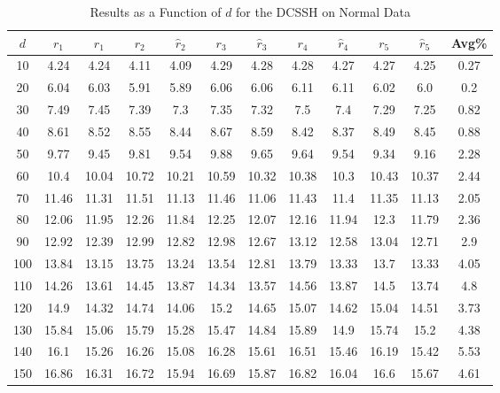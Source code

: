 \documentclass[11pt,twoside]{report}
\theoremstyle{definition}
\numberwithin{theorem}{section}
\numberwithin{definition}{section}
\numberwithin{lemma}{section}
\numberwithin{proposition}{section}
\numberwithin{equation}{section}
\numberwithin{figure}{section}
\begin{document}
\begin{appendices}
    \begin{table}[ht]
        \centering
        \begin{tabular}{|c||cc||cc||cc||cc||cc||c|} \hline
            $d$&$r_1$&$\hat{r}_1$&$r_2$&$\hat{r}_2$&$r_3$&$\hat{r}_3$&$r_4$&$\hat{r}_4$&$r_5$&$\hat{r}_5$&Avg\% \\ \hline
            10&4.24&4.24&4.11&4.09&4.29&4.28&4.28&4.27&4.27&4.25&0.27 \\
            20&6.04&6.03&5.91&5.89&6.06&6.06&6.11&6.11&6.02&6.0&0.2 \\
            30&7.49&7.45&7.39&7.3&7.35&7.32&7.5&7.4&7.29&7.25&0.82 \\
            40&8.61&8.52&8.55&8.44&8.67&8.59&8.42&8.37&8.49&8.45&0.88 \\
            50&9.77&9.45&9.81&9.54&9.88&9.65&9.64&9.54&9.34&9.16&2.28 \\
            60&10.4&10.04&10.72&10.21&10.59&10.32&10.38&10.3&10.43&10.37&2.44 \\
            70&11.46&11.31&11.51&11.13&11.46&11.06&11.43&11.4&11.35&11.13&2.05 \\
            80&12.06&11.95&12.26&11.84&12.25&12.07&12.16&11.94&12.3&11.79&2.36 \\
            90&12.92&12.39&12.99&12.82&12.98&12.67&13.12&12.58&13.04&12.71&2.9 \\
            100&13.84&13.15&13.75&13.24&13.54&12.81&13.79&13.33&13.7&13.33&4.05 \\
            110&14.26&13.61&14.45&13.87&14.34&13.57&14.56&13.87&14.5&13.74&4.8 \\
            120&14.9&14.32&14.74&14.06&15.2&14.65&15.07&14.62&15.04&14.51&3.73 \\
            130&15.84&15.06&15.79&15.28&15.47&14.84&15.89&14.9&15.74&15.2&4.38 \\
            140&16.1&15.26&16.26&15.08&16.28&15.61&16.51&15.46&16.19&15.42&5.53 \\
            150&16.86&16.31&16.72&15.94&16.69&15.87&16.82&16.04&16.6&15.67&4.61 \\ \hline
        \end{tabular}
        \caption{Results as a Function of $d$ for the DCSSH on Normal Data}
        \label{tab:normal_dcssh_table_d}
    \end{table}
    \clearpage
    

\end{appendices}
\end{document}
